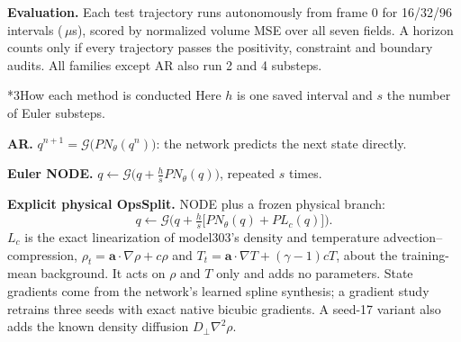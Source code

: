 \documentclass[10pt,letterpaper,twocolumn]{article}
\makeatletter
\renewcommand\section{\@startsection{section}{1}{0pt}{8pt}{4pt}{\normalfont\fontsize{11}{13}\bfseries}}
\makeatother
\begin{document}
\textbf{Evaluation.} Each test trajectory runs autonomously from frame 0 for 16/32/96 intervals (\HorizonUs\,$\mu$s), scored by normalized volume MSE over all seven fields.
A horizon counts only if every trajectory passes the positivity, constraint and boundary audits.
All families except AR also run 2 and 4 substeps.

\section*{3\quad How each method is conducted}
Here $h$ is one saved interval and $s$ the number of Euler substeps.

\textbf{AR.} $q^{n+1}=\mathcal G\big(PN_\theta(q^n)\big)$: the network predicts the next state directly.

\textbf{Euler NODE.} $q\leftarrow\mathcal G\big(q+\tfrac hs PN_\theta(q)\big)$, repeated $s$ times.

\textbf{Explicit physical OpsSplit.} NODE plus a frozen physical branch:
\begin{equation*}
q\leftarrow\mathcal G\Big(q+\tfrac hs\big[PN_\theta(q)+PL_c(q)\big]\Big).
\end{equation*}
$L_c$ is the exact linearization of model303's density and temperature advection--compression,
$\rho_t=\mathbf a\cdot\nabla\rho+c\rho$ and $T_t=\mathbf a\cdot\nabla T+(\gamma-1)cT$, about the training-mean background.
It acts on $\rho$ and $T$ only and adds no parameters.
State gradients come from the network's learned spline synthesis; a gradient study retrains three seeds with exact native bicubic gradients.
A seed-17 variant also adds the known density diffusion $D_\perp\nabla^2\rho$.
\end{document}
